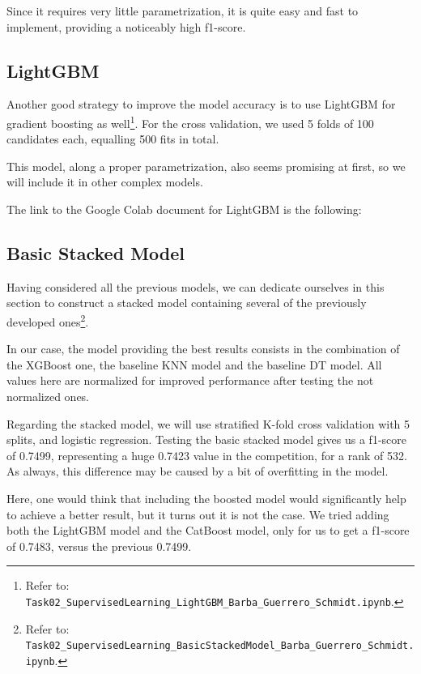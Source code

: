 Since it requires very little parametrization, it is quite easy and fast to implement, providing a noticeably high f1-score.

\subsection{LightGBM}
\label{SECTION_LightBGM}

Another good strategy to improve the model accuracy is to use LightGBM for gradient boosting as well\footnote{Refer to: \texttt{Task02\_SupervisedLearning\_LightGBM\_Barba\_Guerrero\_Schmidt.ipynb}.}. For the cross validation, we used 5 folds of 100 candidates each, equalling 500 fits in total.

This model, along a proper parametrization, also seems promising at first, so we will include it in other complex models.

The link to the Google Colab document for LightGBM is the following:

\subsection{Basic Stacked Model}
\label{SUBSECTION_BSM}

Having considered all the previous models, we can dedicate ourselves in this section to construct a stacked model containing several of the previously developed ones\footnote{Refer to: \texttt{Task02\_SupervisedLearning\_BasicStackedModel\_Barba\_Guerrero\_Schmidt.ipynb}.}.

In our case, the model providing the best results consists in the combination of the XGBoost one, the baseline KNN model and the baseline DT model. All values here are normalized for improved performance after testing the not normalized ones.

Regarding the stacked model, we will use stratified K-fold cross validation with 5 splits, and logistic regression. Testing the basic stacked model gives us a f1-score of 0.7499, representing a huge 0.7423 value in the competition, for a rank of 532. As always, this difference may be caused by a bit of overfitting in the model.

Here, one would think that including the boosted model would significantly help to achieve a better result, but it turns out it is not the case. We tried adding both the LightGBM model and the CatBoost model, only for us to get a f1-score of 0.7483, versus the previous 0.7499.